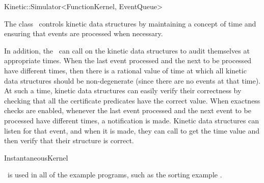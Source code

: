 

\begin{ccRefClass}{Kinetic::Simulator<FunctionKernel, EventQueue>}  %


\ccDefinition
  
The class \ccRefName\ controls kinetic data structures by maintaining
a concept of time and ensuring that events are processed when
necessary. 

In addition, the \ccRefName\ can call on the kinetic data structures
to audit themselves at appropriate times. When the last event
processed and the next to be processed have different times, then
there is a rational value of time at which all kinetic data structures
should be non-degenerate (since there are no events at that time). At
such a time, kinetic data structures can easily verify their
correctness by checking that all the certificate predicates have the
correct value. When exactness checks are enabled, whenever the last
event processed and the next event to be processed have different
times, a
 notification is made. Kinetic
data structures can listen for that event, and when it is made, they
can call  to get the time value and
then verify that their structure is correct.


\ccIsModel

InstantaneousKernel



\ccCreation
{}  %


\ccExample

\ccRefName\ is used in all of the example programs, such as the sorting example
.



\end{ccRefClass}


